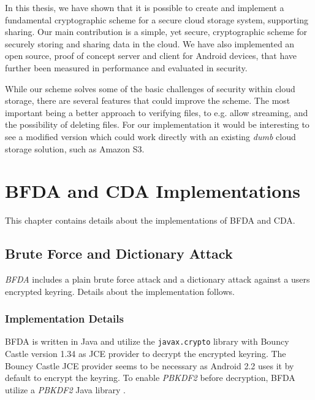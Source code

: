 \documentclass[pdftex,english,10pt,b5paper,twoside]{book}
\begin{document}
In this thesis, we have shown that it is possible to create and implement a
fundamental cryptographic scheme for a secure cloud storage system, supporting
sharing. Our main contribution is a simple, yet secure, cryptographic scheme
for securely storing and sharing data in the cloud. We have also implemented an
open source, proof of concept server and client for Android devices, that have
further been measured in performance and evaluated in security.

While our scheme solves some of the basic challenges of security within cloud
storage, there are several features that could improve the scheme. The most
important being a better approach to verifying files, to e.g. allow streaming,
and the possibility of deleting files. For our implementation it would be
interesting to see a modified version which could work directly with
an existing \emph{dumb} cloud storage solution, such as Amazon S3.



\appendix
\appendixpage
\addappheadtotoc
\chapter{\ac{BFDA} and \ac{CDA} Implementations}
\label{ap:other}

This chapter contains details about the implementations of \ac{BFDA} and
\ac{CDA}.

\section{Brute Force and Dictionary Attack}

\emph{\ac{BFDA}} includes a plain brute force attack and a dictionary attack against
a users encrypted keyring. Details about the implementation follows.

\subsection{Implementation Details}

\ac{BFDA} is written in Java and utilize the \texttt{javax.crypto} library with Bouncy
Castle version 1.34 as JCE provider to decrypt the encrypted keyring. The
Bouncy Castle JCE provider seems to be necessary as Android 2.2 uses it by
default to encrypt the keyring. To enable \emph{PBKDF2} before decryption, \ac{BFDA}
utilize a \emph{PBKDF2} Java library \cite{pbkdf2}.
\end{document}
